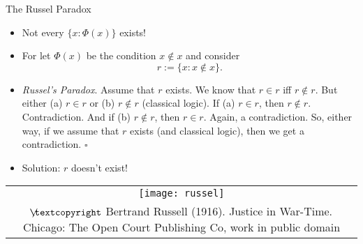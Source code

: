 \begin{frame}{The Russel Paradox}

	\begin{itemize}
	
		\item Not every $\{x: \Phi(x)\}$ exists!
		
		\item For let $\Phi(x)$ be the condition $x\notin x$ and consider \[r:=\{x:x\notin x\}.\] 
		
		\item \emph{Russel's Paradox}. Assume that $r$ exists.  We know that $r\in r$ iff $r\notin r$.  But either (a) $r\in r$ or (b) $r\notin r$ (classical logic).  If (a) $r\in r$, then $r\notin r$.  Contradiction.  And if (b) $r\notin r$, then $r\in r$. Again, a contradiction.  So, either way, if we assume that $r$ exists (and classical logic), then we get a contradiction.  \hfill $\square$ 
		
		\item Solution: $r$ doesn't exist!
	
	\end{itemize}
	
	\begin{center}
		\begin{tabular}{c}
		\texttt{[image: russel]}\\[-1ex]
		{\tiny $\not\hspace{-1ex}\textcopyright$ Bertrand Russell (1916). Justice in War-Time. Chicago: The Open Court Publishing Co, work in public domain}
		\end{tabular}
		\end{center}
	

\end{frame}

